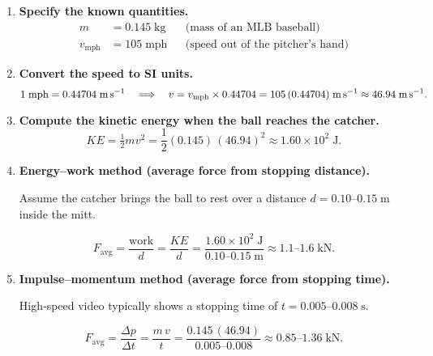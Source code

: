 \documentclass[12pt]{article}
\title{}
\author{Jerich Lee}
\date{\today}
\theoremstyle{definition} %
\theoremstyle{plain} %
\begin{document}
\maketitle

\begin{enumerate}[label=\textbf{Step \arabic*:}, leftmargin=2.2em]

  \item \textbf{Specify the known quantities.}
  \[
    \begin{aligned}
      m &= 0.145\;\text{kg} &&\text{(mass of an MLB baseball)}\\
      v_{\text{mph}} &= 105\;\text{mph} &&\text{(speed out of the pitcher’s hand)}
    \end{aligned}
  \]

  \item \textbf{Convert the speed to SI units.}
  \[
    1\;\text{mph}=0.44704\;\text{m\,s}^{-1}\quad\Longrightarrow\quad
    v = v_{\text{mph}}\times 0.44704
      = 105\,(0.44704)\;\text{m\,s}^{-1}
      \approx 46.94\;\text{m\,s}^{-1}.
  \]

  \item \textbf{Compute the kinetic energy when the ball reaches the catcher.}
  \[
    KE = \tfrac12 m v^{2}
        = \frac{1}{2}(0.145)\,(46.94)^{2}
        \approx 1.60\times 10^{2}\;\text{J}.
  \]

  \item \textbf{Energy–work method (average force from stopping distance).}

        Assume the catcher brings the ball to rest over a distance
        \(d = 0.10\text{–}0.15\;\text{m}\) inside the mitt.

        \[
          F_{\text{avg}}
            = \frac{\text{work}}{d}
            = \frac{KE}{d}
            = \frac{1.60\times 10^{2}\;\text{J}}{0.10\text{–}0.15\;\text{m}}
            \approx 1.1\text{–}1.6\;\text{kN}.
        \]

  \item \textbf{Impulse–momentum method (average force from stopping time).}

        High‑speed video typically shows a stopping time of
        \(t = 0.005\text{–}0.008\;\text{s}\).

        \[
          F_{\text{avg}}
            = \frac{\Delta p}{\Delta t}
            = \frac{m\,v}{t}
            = \frac{0.145\,(46.94)}{0.005\text{–}0.008}
            \approx 0.85\text{–}1.36\;\text{kN}.
        \]


\end{enumerate}
\end{document}
